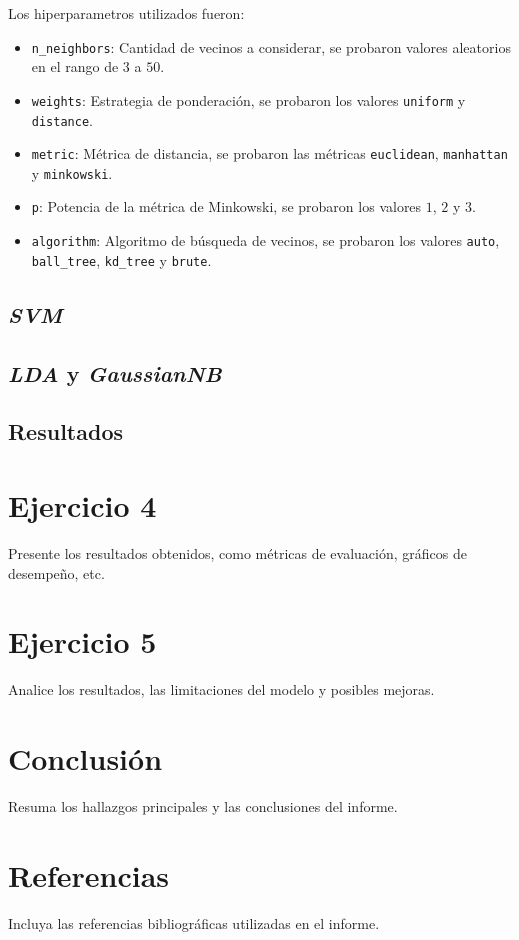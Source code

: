 \documentclass[12pt,a4paper]{article}
\begin{document}
Los hiperparametros utilizados fueron:

\begin{itemize}
    \item \texttt{n\_neighbors}: Cantidad de vecinos a considerar, se probaron valores aleatorios en el rango de $3$ a $50$.
    \item \texttt{weights}: Estrategia de ponderación, se probaron los valores \texttt{uniform} y \texttt{distance}.
    \item \texttt{metric}: Métrica de distancia, se probaron las métricas \texttt{euclidean}, \texttt{manhattan} y \texttt{minkowski}.
    \item \texttt{p}: Potencia de la métrica de Minkowski, se probaron los valores $1$, $2$ y $3$.
    \item \texttt{algorithm}: Algoritmo de búsqueda de vecinos, se probaron los valores \texttt{auto}, \texttt{ball\_tree}, \texttt{kd\_tree} y \texttt{brute}.
\end{itemize}

\subsection{\textit{SVM}}
\subsection{\textit{LDA} y \textit{GaussianNB}}


\subsection{Resultados}

 \section{Ejercicio 4}
Presente los resultados obtenidos, como métricas de evaluación, gráficos de desempeño, etc.

\section{Ejercicio 5}
Analice los resultados, las limitaciones del modelo y posibles mejoras.

\section{Conclusión}
Resuma los hallazgos principales y las conclusiones del informe.

\section*{Referencias}
Incluya las referencias bibliográficas utilizadas en el informe.
\end{document}
